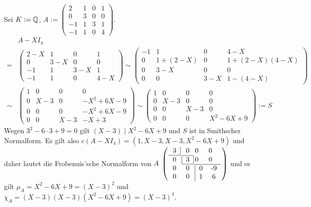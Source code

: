 \documentclass[../../main.tex]{subfiles}
\begin{document}
\begin{bsp}\label{17.5.6}
    Sei $K:=\mathbb Q$, $A:=\begin{pmatrix}2&1&0&1\\0&3&0&0\\-1&1&3&1\\-1&1&0&4\end{pmatrix}$.
    \begin{align*}
        &A-XI_4\\
        =&\begin{pmatrix}2-X&1&0&1\\0&3-X&0&0\\-1&1&3-X&1\\-1&1&0&4-X\end{pmatrix}\sim\begin{pmatrix}-1&1&0&4-X\\0&1+(2-X)&0&1+(2-X)(4-X)\\0&3-X&0&0\\0&0&3-X&1-(4-X)\end{pmatrix}\\
        \sim&\begin{pmatrix}1&0&0&0\\0&X-3&0&-X^2+6X-9\\0&0&0&-X^2+6X-9\\0&0&X-3&-X+3\end{pmatrix}\sim\begin{pmatrix}1&0&0&0\\0&X-3&0&0\\0&0&X-3&0\\0&0&0&X^2-6X+9\end{pmatrix}:=S
    \end{align*}
    Wegen $3^2-6\cdot 3+9=0$ gilt $(X-3)\mid X^2-6X+9$ und $S$ ist in Smithscher Normalform. Es gilt also $c(A-XI_4)=(1,X-3,X-3,X^2-6X+9)$ und daher lautet die Frobenuis'sche Normalform von $A$ $\arraycolsep=1pt
    \left(\begin{array}{c c c c}
        \begin{tabular}{c|}3\\\hline\end{tabular}&0&0&0\\
        0&\begin{tabular}{|c|}\hline 3\\\hline\end{tabular}&0&0\\
        0&0&\multicolumn{2}{c}{\multirow{2}{*}{\begin{tabular}{|cc}
        \hline 0&-9\\1&6\end{tabular}}}\\0&0
    \end{array}\right)$ und es gilt $\mu_A=X^2-6X+9=(X-3)^2$ und $\chi_A=(X-3)(X-3)(X^2-6X+9)=(X-3)^4$.
\end{bsp}
\end{document}
